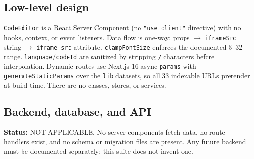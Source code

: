 \subsection{Low-level design}
\texttt{CodeEditor} is a React Server Component (no \texttt{"use client"} directive) with no hooks, context, or event listeners. Data flow is one-way: props $\rightarrow$ \texttt{iframeSrc} string $\rightarrow$ \texttt{iframe src} attribute. \texttt{clampFontSize} enforces the documented 8--32 range. \texttt{language}/\texttt{codeId} are sanitized by stripping \texttt{/} characters before interpolation. Dynamic routes use Next.js 16 async \texttt{params} with \texttt{generateStaticParams} over the \texttt{lib} datasets, so all 33 indexable URLs prerender at build time. There are no classes, stores, or services.

\subsection{Backend, database, and API}
\textbf{Status:} NOT APPLICABLE. No server components fetch data, no route handlers exist, and no schema or migration files are present. Any future backend must be documented separately; this suite does not invent one.
